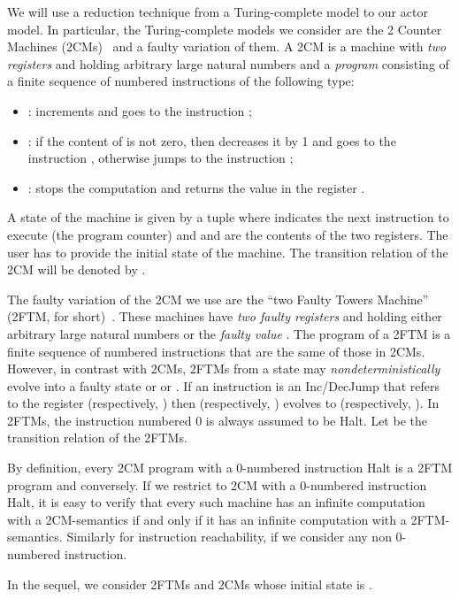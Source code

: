 \documentclass{LMCS}
\theoremstyle{plain}\newtheorem{proposition}[thm]{Proposition}
\theoremstyle{plain}\newtheorem{lemma}[thm]{Lemma}
\theoremstyle{plain}\newtheorem{theorem}[thm]{Theorem}
\theoremstyle{plain}\newtheorem{corollary}[thm]{Corollary}
\begin{document}
We will use a reduction technique 
from a Turing-complete model to our actor model.
In particular, the Turing-complete models we consider are the 2 Counter Machines 
(2CMs)~\cite{Minsky67}
and a faulty variation of them.
A 2CM  is a machine with \emph{two registers} 
 and  holding arbitrary large natural numbers and a 
\emph{program}  consisting of a finite sequence of numbered 
instructions of the following type:
\begin{itemize}
 \item : increments  
 and goes to the instruction ;
 \item : if the content of  is not 
 zero, then decreases it by 1 and goes to the instruction , otherwise jumps to the instruction ;
 \item : stops the computation and returns the value in 
 the register .
\end{itemize}
A state of the machine is given by a tuple  where 
 indicates the next instruction to execute (the program counter)
and  and  are the contents of the two registers. The
user has to provide the initial state of the machine. 
The transition relation of the 2CM will be denoted by .


The faulty variation of the 2CM we use are the
``two Faulty Towers Machine'' (2FTM, for short)~\cite{FTM}. These machines have
\emph{two faulty registers} 
 and  holding either arbitrary large natural numbers or the \emph{faulty value} 
. The program of a 2FTM is a finite sequence of numbered instructions that are 
the same of those in 2CMs. However, in contrast with 2CMs, 2FTMs from a state
 may
\emph{nondeterministically} evolve into a faulty state  or 
 or
. If an instruction  is an {\sf Inc}/{\sf DecJump} that refers to
the register  (respectively, ) then  (respectively, 
) evolves to  (respectively, ).
In 2FTMs, the instruction numbered 0 is always assumed to be {\sf Halt}.
Let  be the transition relation of the  2FTMs.

By definition, every 2CM program with a 0-numbered instruction {\sf Halt} is 
a 2FTM program and conversely. If we restrict to 2CM with a 0-numbered instruction {\sf Halt},
it is easy to verify that every 
such machine has an infinite computation with a 2CM-semantics if and only if it
has an infinite computation with a 2FTM-semantics. Similarly for instruction reachability,
if we consider any non 0-numbered instruction.

In the sequel, we consider 2FTMs and 2CMs whose initial state is .
\end{document}
